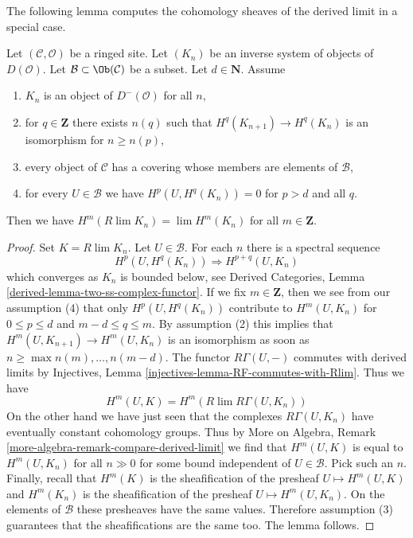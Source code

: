 \noindent
The following lemma computes the cohomology sheaves of the
derived limit in a special case.

\begin{lemma}
\label{lemma-Rlim-of-system}
Let $(\mathcal{C}, \mathcal{O})$ be a ringed site. Let $(K_n)$
be an inverse system of objects of $D(\mathcal{O})$.
Let $\mathcal{B} \subset \Ob(\mathcal{C})$ be a subset.
Let $d \in \mathbf{N}$. Assume
\begin{enumerate}
\item $K_n$ is an object of $D^-(\mathcal{O})$ for all $n$,
\item for $q \in \mathbf{Z}$ there exists
$n(q)$ such that $H^q(K_{n + 1}) \to H^q(K_n)$ is an isomorphism for
$n \geq n(p)$,
\item every object of $\mathcal{C}$ has a covering whose members are
elements of $\mathcal{B}$,
\item for every $U \in \mathcal{B}$ we have $H^p(U, H^q(K_n)) = 0$
for $p > d$ and all $q$.
\end{enumerate}
Then we have $H^m(R\lim K_n) = \lim H^m(K_n)$ for all $m \in \mathbf{Z}$.
\end{lemma}

\begin{proof}
Set $K = R\lim K_n$. Let $U \in \mathcal{B}$. For each $n$ there is a spectral
sequence
$$
H^p(U, H^q(K_n)) \Rightarrow H^{p + q}(U, K_n)
$$
which converges as $K_n$ is bounded below, see
Derived Categories, Lemma \ref{derived-lemma-two-ss-complex-functor}.
If we fix $m \in \mathbf{Z}$, then we see from our assumption (4)
that only $H^p(U, H^q(K_n))$ contribute to $H^m(U, K_n)$
for $0 \leq p \leq d$ and $m - d \leq q \leq m$. By assumption (2)
this implies that $H^m(U, K_{n + 1}) \to H^m(U, K_n)$ is an isomorphism
as soon as $n \geq \max{n(m), \ldots, n(m - d)}$. The functor $R\Gamma(U, -)$
commutes with derived limits by
Injectives, Lemma \ref{injectives-lemma-RF-commutes-with-Rlim}.
Thus we have
$$
H^m(U, K) = H^m(R\lim R\Gamma(U, K_n))
$$
On the other hand we have just seen that the complexes $R\Gamma(U, K_n)$
have eventually constant cohomology groups. Thus by
More on Algebra, Remark \ref{more-algebra-remark-compare-derived-limit}
we find that $H^m(U, K)$ is equal to $H^m(U, K_n)$ for
all $n \gg 0$ for some bound independent of $U \in \mathcal{B}$.
Pick such an $n$. Finally, recall that $H^m(K)$ is the sheafification of
the presheaf $U \mapsto H^m(U, K)$ and $H^m(K_n)$ is the sheafification
of the presheaf $U \mapsto H^m(U, K_n)$. On the elements
of $\mathcal{B}$ these presheaves have the same values. Therefore assumption
(3) guarantees that the sheafifications are the same too.
The lemma follows.
\end{proof}

